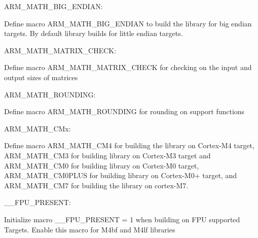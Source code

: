 \begin{DoxyItemize}
\item A\-R\-M\-\_\-\-M\-A\-T\-H\-\_\-\-B\-I\-G\-\_\-\-E\-N\-D\-I\-A\-N\-:
\end{DoxyItemize}

Define macro A\-R\-M\-\_\-\-M\-A\-T\-H\-\_\-\-B\-I\-G\-\_\-\-E\-N\-D\-I\-A\-N to build the library for big endian targets. By default library builds for little endian targets.


\begin{DoxyItemize}
\item A\-R\-M\-\_\-\-M\-A\-T\-H\-\_\-\-M\-A\-T\-R\-I\-X\-\_\-\-C\-H\-E\-C\-K\-:
\end{DoxyItemize}

Define macro A\-R\-M\-\_\-\-M\-A\-T\-H\-\_\-\-M\-A\-T\-R\-I\-X\-\_\-\-C\-H\-E\-C\-K for checking on the input and output sizes of matrices


\begin{DoxyItemize}
\item A\-R\-M\-\_\-\-M\-A\-T\-H\-\_\-\-R\-O\-U\-N\-D\-I\-N\-G\-:
\end{DoxyItemize}

Define macro A\-R\-M\-\_\-\-M\-A\-T\-H\-\_\-\-R\-O\-U\-N\-D\-I\-N\-G for rounding on support functions


\begin{DoxyItemize}
\item A\-R\-M\-\_\-\-M\-A\-T\-H\-\_\-\-C\-Mx\-:
\end{DoxyItemize}

Define macro A\-R\-M\-\_\-\-M\-A\-T\-H\-\_\-\-C\-M4 for building the library on Cortex-\/\-M4 target, A\-R\-M\-\_\-\-M\-A\-T\-H\-\_\-\-C\-M3 for building library on Cortex-\/\-M3 target and A\-R\-M\-\_\-\-M\-A\-T\-H\-\_\-\-C\-M0 for building library on Cortex-\/\-M0 target, A\-R\-M\-\_\-\-M\-A\-T\-H\-\_\-\-C\-M0\-P\-L\-U\-S for building library on Cortex-\/\-M0+ target, and A\-R\-M\-\_\-\-M\-A\-T\-H\-\_\-\-C\-M7 for building the library on cortex-\/\-M7.


\begin{DoxyItemize}
\item \-\_\-\-\_\-\-F\-P\-U\-\_\-\-P\-R\-E\-S\-E\-N\-T\-:
\end{DoxyItemize}

Initialize macro \-\_\-\-\_\-\-F\-P\-U\-\_\-\-P\-R\-E\-S\-E\-N\-T = 1 when building on F\-P\-U supported Targets. Enable this macro for M4bf and M4lf libraries



